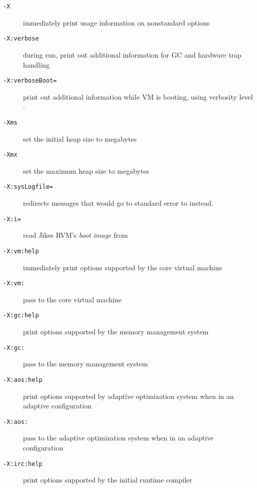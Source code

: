 \begin{description}
\item [{\tt -X}]
immediately print usage information on nonstandard options

\item[{\tt -X:verbose}]
during run, print out additional information for GC and hardware trap handling

\item[{\tt -X:verboseBoot=}]
print out additional information while VM is booting, using verbosity
level .

\item[{\tt -Xms}]
set the initial heap size to  megabytes

\item[{\tt -Xmx}]
set the maximum heap size to  megabytes

\item[{\tt -X:sysLogfile=}]
redirects messages that would go to standard error to  instead.

\item[{\tt -X:i=}]
read Jikes RVM's \emph{boot image} from 

\item[{\tt -X:vm\Mlsq{}:help\Mrsq{}}]
immediately print options supported by the core virtual machine

\item[{\tt -X:vm:}]
pass  to the core virtual machine

\item[{\tt -X:gc\Mlsq{}:help\Mrsq}]
print options supported by the memory management system

\item[{\tt -X:gc:}]
pass  to the memory management system

\item[{\tt -X:aos\Mlsq{}:help\Mrsq{}}]
print options supported by adaptive optimization system when in an
adaptive configuration

\item[{\tt -X:aos:}]
pass  to the adaptive optimization system when in an adaptive configuration

\item[{\tt -X:irc\Mlsq{}:help\Mrsq{}}]
print options supported by the initial runtime compiler


\end{description}
